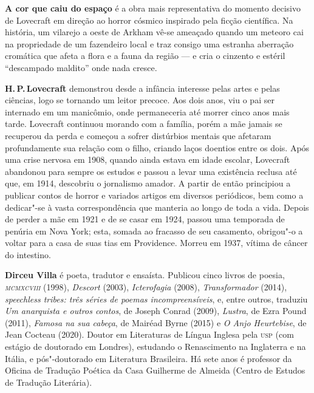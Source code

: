 \textbf{A cor que caiu do espaço} é a obra mais representativa do momento decisivo de Lovecraft em direção
ao horror cósmico inspirado pela ficção
científica. Na história, um vilarejo a oeste de Arkham vê-se ameaçado quando um
meteoro cai na propriedade de um fazendeiro local e traz consigo uma estranha
aberração cromática que afeta a flora e a fauna da região --- e cria o cinzento e
estéril “descampado maldito” onde nada cresce.

\textbf{H.\,P.\,Lovecraft} demonstrou desde a infância interesse pelas artes e
pelas ciências, logo se tornando um leitor precoce. Aos dois anos, viu o pai ser internado em um manicômio, onde permaneceria até
morrer cinco anos mais tarde. Lovecraft continuou morando com a família,
porém a mãe jamais se recuperou da perda e começou a sofrer 
distúrbios mentais que afetaram profundamente sua relação com o filho,
criando laços doentios entre os dois. Após uma crise nervosa em 1908,
quando ainda estava em idade escolar, Lovecraft abandonou para sempre os
estudos e passou a levar uma existência reclusa até que, em 1914,
descobriu o jornalismo amador. A partir de então principiou a publicar
contos de horror e variados artigos em diversos periódicos, bem como a dedicar"-se à vasta
correspondência que manteria ao longo de toda a vida.
Depois de perder a mãe em 1921 e de se casar em 1924, passou uma temporada
de penúria em Nova York; esta, somada ao fracasso de seu casamento,
obrigou"-o a voltar para a casa de suas tias em Providence.
Morreu em 1937, vítima de câncer do intestino.

\textbf{Dirceu Villa} é poeta, tradutor e ensaísta. Publicou cinco livros de poesia, \emph{\textsc{mcmxcviii}} (1998), \emph{Descort} (2003), \emph{Icterofagia} (2008), \emph{Transformador} (2014), \emph{speechless tribes: três séries de poemas incompreensíveis}, e, entre outros, traduziu \emph{Um anarquista e outros contos}, de Joseph Conrad (2009), \emph{Lustra}, de Ezra Pound (2011), \emph{Famosa na sua cabeça}, de Mairéad Byrne (2015) e \emph{O Anjo Heurtebise}, de Jean Cocteau (2020). Doutor em Literaturas de Língua Inglesa pela \textsc{usp} (com estágio de doutorado em Londres), estudando o Renascimento na Inglaterra e na Itália, e pós"-doutorado em Literatura Brasileira. Há sete anos é professor da Oficina de Tradução Poética da Casa Guilherme de Almeida (Centro de Estudos de Tradução Literária).

